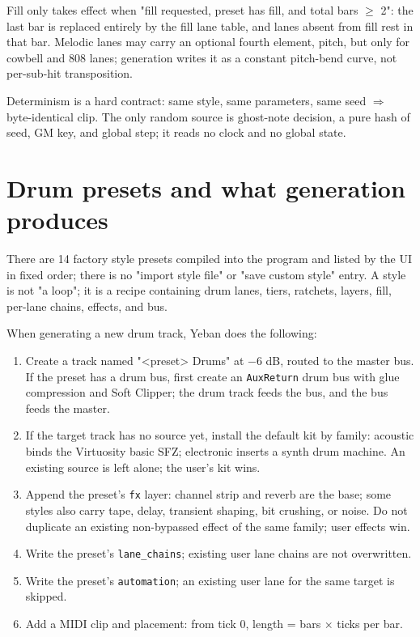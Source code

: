 Fill only takes effect when "fill requested, preset has fill, and total bars $\geq$ 2": the last bar is replaced entirely by the fill lane table, and lanes absent from fill rest in that bar. Melodic lanes may carry an optional fourth element, pitch, but only for cowbell and 808 lanes; generation writes it as a constant pitch-bend curve, not per-sub-hit transposition.

Determinism is a hard contract: same style, same parameters, same seed $\Rightarrow$ byte-identical clip. The only random source is ghost-note decision, a pure hash of seed, GM key, and global step; it reads no clock and no global state.

\section{Drum presets and what generation produces}

There are 14 factory style presets compiled into the program and listed by the UI in fixed order; there is no "import style file" or "save custom style" entry. A style is not "a loop"; it is a recipe containing drum lanes, tiers, ratchets, layers, fill, per-lane chains, effects, and bus.

When generating a new drum track, Yeban does the following:

\begin{enumerate}
  \item Create a track named "<preset> Drums" at −6 dB, routed to the master bus. If the preset has a drum bus, first create an \texttt{AuxReturn} drum bus with glue compression and Soft Clipper; the drum track feeds the bus, and the bus feeds the master.
  \item If the target track has no source yet, install the default kit by family: acoustic binds the Virtuosity basic SFZ; electronic inserts a synth drum machine. An existing source is left alone; the user's kit wins.
  \item Append the preset's \texttt{fx} layer: channel strip and reverb are the base; some styles also carry tape, delay, transient shaping, bit crushing, or noise. Do not duplicate an existing non-bypassed effect of the same family; user effects win.
  \item Write the preset's \texttt{lane\_chains}; existing user lane chains are not overwritten.
  \item Write the preset's \texttt{automation}; an existing user lane for the same target is skipped.
  \item Add a MIDI clip and placement: from tick 0, length = bars × ticks per bar.
\end{enumerate}

